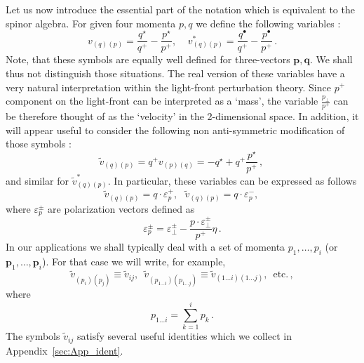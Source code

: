 \documentclass[english,american]{article}
\begin{document}
Let us now introduce the essential part of the notation which is equivalent
to the spinor algebra. For given four momenta $p,q$ we define the
following variables \citep{Motyka2009}:
\begin{equation}
v_{\left(q\right)\left(p\right)}=\frac{q^{\star}}{q^{+}}-\frac{p^{\star}}{p^{+}},\;\;\;\; v_{\left(q\right)\left(p\right)}^{*}=\frac{q^{\bullet}}{q^{+}}-\frac{p^{\bullet}}{p^{+}}\,.\label{eq:v_def}
\end{equation}
Note, that these symbols are equally well defined for three-vectors
$\mathbf{p},\mathbf{q}$. We shall thus not distinguish those situations. The real version of these variables have a very natural interpretation within the light-front perturbation theory. Since $p^+$ component on the light-front can be interpreted as a `mass', the variable  $\frac{p_{\perp}}{p^+}$ can be therefore thought of as the `velocity' in the 2-dimensional space. 
In addition, it will appear useful to consider the following non anti-symmetric
modification of those symbols \citep{Cruz-Santiago2015}:
\begin{equation}
\tilde{v}_{\left(q\right)\left(p\right)}=q^{+}v_{\left(p\right)\left(q\right)}=-q^{\star}+q^{+}\frac{p^{\star}}{p^{+}} \, ,\,\label{eq:vtild_def}
\end{equation}
and similar for $\tilde{v}_{\left(q\right)\left(p\right)}^{*}$. In
particular, these variables can be expressed as follows
\begin{equation}
\tilde{v}_{\left(q\right)\left(p\right)}=q\cdot\varepsilon_{p}^{+},\,\,\,\,\tilde{v}_{\left(q\right)\left(p\right)}=q\cdot\varepsilon_{p}^{-},\,
\end{equation}
where $\varepsilon_{p}^{\pm}$ are polarization vectors defined as
\begin{equation}
\varepsilon_{p}^{\pm}=\varepsilon_{\perp}^{\pm}-\frac{p\cdot\varepsilon_{\perp}^{\pm}}{p^{+}}\eta\,.\label{eq:PolarizationVect}
\end{equation}
In our applications we shall typically deal with a set of momenta
$p_{1},\dots,p_{i}$ (or $\mathbf{p}_{1},\dots,\mathbf{p}_{i}$).
For that case we will write, for example,
\begin{equation}
\tilde{v}_{\left(p_{i}\right)\left(p_{j}\right)}\equiv\tilde{v}_{ij},\,\,\,\tilde{v}_{\left(p_{1\dots i}\right)\left(p_{1\dots j}\right)}\equiv\tilde{v}_{\left(1\dots i\right)\left(1\dots j\right)},\,\,\,\textrm{etc.}\,,
\end{equation}
where
\begin{equation}
p_{1\dots i}=\sum_{k=1}^{i}p_{k}\,.\label{eq:momentum_sum_def}
\end{equation}
 The symbols $\tilde{v}_{ij}$ satisfy several useful identities which
we collect in Appendix~\ref{sec:App_ident}.
\end{document}
